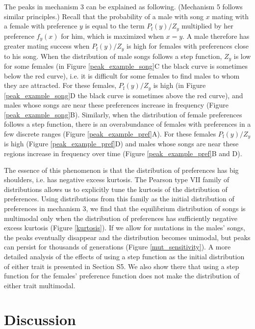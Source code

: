 \documentclass[12pt]{article}
\newcommand{\x}[1]{\text{#1}}
\begin{document}
The peaks in mechanism 3 can be explained as following. (Mechanism 5 follows similar principles.) Recall that the probability of a male with song $x$ mating with a female with preference $y$ is equal to the term $P_\x{f}(y)/Z_y$ multiplied by her preference $f_y(x)$ for him, which is maximized when $x=y$. A male therefore has greater mating success when $P_\x{f}(y)/Z_y$ is high for females with preferences close to his song. When the distribution of male songs follows a step function, $Z_y$ is low for some females (in Figure \ref{peak_example_song}C the black curve is sometimes below the red curve), i.e. it is difficult for some females to find males to whom they are attracted. For these females, $P_\x{f}(y)/Z_y$ is high (in Figure \ref{peak_example_song}D the black curve is sometimes above the red curve), and males whose songs are near these preferences increase in frequency (Figure \ref{peak_example_song}B). Similarly, when the distribution of female preferences follows a step function, there is an overabundance of females with preferences in a few discrete ranges (Figure \ref{peak_example_pref}A). For these females $P_\x{f}(y)/Z_y$ is high (Figure \ref{peak_example_pref}D) and males whose songs are near these regions increase in frequency over time (Figure \ref{peak_example_pref}B and D). 

The essence of this phenomenon is that the distribution of preferences has big shoulders, i.e. has negative excess kurtosis. The Pearson type VII family of distributions allows us to explicitly tune the kurtosis of the distribution of preferences. Using distributions from this family as the initial distribution of preferences in mechanism 3, we find that the equilibrium distribution of songs is multimodal only when the distribution of preferences has sufficiently negative excess kurtosis (Figure \ref{kurtosis}). If we allow for mutations in the males' songs, the peaks eventually disappear and the distribution becomes unimodal, but peaks can persist for thousands of generations (Figure \ref{mut_sensitivity}). A more detailed analysis of the effects of using a step function as the initial distribution of either trait is presented in Section S5. We also show there that using a step function for the females' preference function does not make the distribution of either trait multimodal.

\section*{Discussion}
\end{document}
